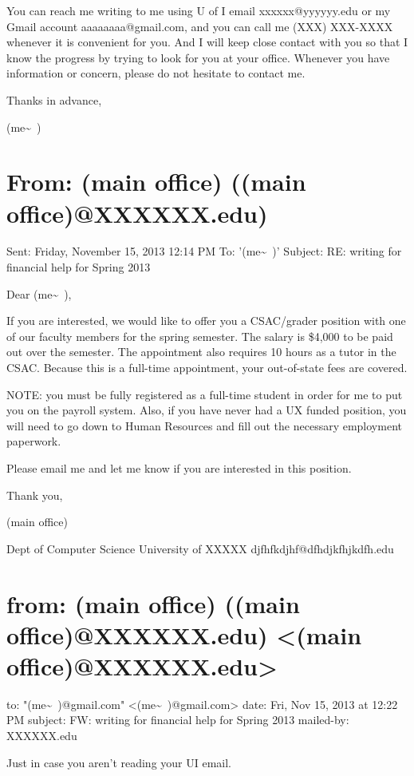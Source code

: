 \documentclass[12pt]{book}
\begin{document}
You can reach me writing to me using U of I email xxxxxx@yyyyyy.edu or my Gmail account aaaaaaaa@gmail.com, and you can call me (XXX) XXX-XXXX whenever it is convenient for you. And I will keep close contact with you so that I know the progress by trying to look for you at your office. Whenever you have information or concern, please do not hesitate to contact me.

Thanks in advance,

(me\textasciitilde{}~)


\section{From: (main office) ((main office)@XXXXXX.edu)}
\label{sec-47-2}
Sent: Friday, November 15, 2013 12:14 PM
To: '(me\textasciitilde{}~)'
Subject: RE: writing for financial help for Spring 2013

Dear (me\textasciitilde{}~),

If you are interested, we would like to offer you a CSAC/grader position with one of our faculty members for the spring semester.  The salary is \$4,000 to be paid out over the semester.  The appointment also requires 10 hours as a tutor in the CSAC.  Because this is a full-time appointment, your out-of-state fees are covered.

NOTE: you must be fully registered as a full-time student in order for me to put you on the payroll system.  Also, if you have never had a UX funded position, you will need to go down to Human Resources and fill out the necessary employment paperwork.

Please email me and let me know if you are interested in this position.

Thank you,

(main office)

Dept of Computer Science
University of XXXXX
djfhfkdjhf@dfhdjkfhjkdfh.edu


\section{from:         (main office) ((main office)@XXXXXX.edu) <(main office)@XXXXXX.edu>}
\label{sec-47-3}
to:         "(me\textasciitilde{}~)@gmail.com" <(me\textasciitilde{}~)@gmail.com>
date:         Fri, Nov 15, 2013 at 12:22 PM
subject:         FW: writing for financial help for Spring 2013
mailed-by:         XXXXXX.edu

Just in case you aren't reading your UI email.
\end{document}
